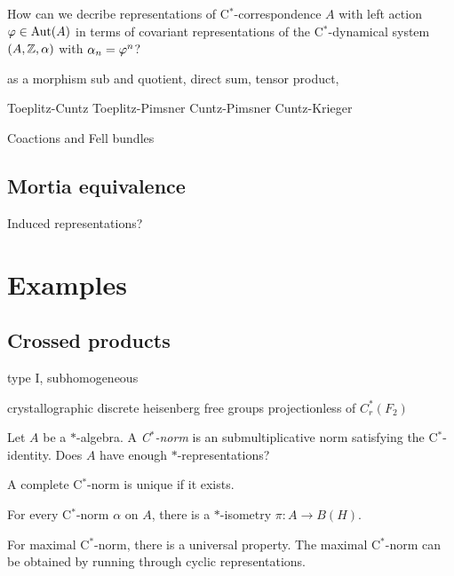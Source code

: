 \documentclass{../../large}
\begin{document}
How can we decribe representations of C$^*$-correspondence $A$ with left action $\varphi\in\operatorname{Aut}(A)$ in terms of covariant representations of the C$^*$-dynamical system $(A,\mathbb{Z},\alpha)$ with $\alpha_n=\varphi^n$?



as a morphism
sub and quotient, direct sum, tensor product,

Toeplitz-Cuntz
Toeplitz-Pimsner
Cuntz-Pimsner
Cuntz-Krieger



Coactions and Fell bundles


\section{Mortia equivalence}



Induced representations?







\chapter{Examples}



\section{Crossed products}


\begin{prb}
\end{prb}



type I, subhomogeneous


crystallographic
discrete heisenberg
free groups
projectionless of $C_r^*(F_2)$



\begin{prb}
Let $A$ be a $*$-algebra.
A \emph{C$^*$-norm} is an submultiplicative norm satisfying the C$^*$-identity.
Does $A$ have enough $*$-representations?
\begin{parts}
\item A complete C$^*$-norm is unique if it exists.
\item For every C$^*$-norm $\alpha$ on $A$, there is a $*$-isometry $\pi:A\to B(H)$.
\item For maximal C$^*$-norm, there is a universal property. The maximal C$^*$-norm can be obtained by running through cyclic representations.
\end{parts}
\end{prb}
\end{document}
